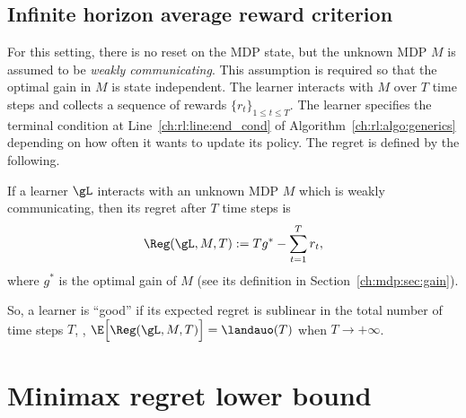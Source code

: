 \subsection{Infinite horizon average reward criterion}
For this setting, there is no reset on the MDP state, but the unknown MDP $M$ is assumed to be \emph{weakly communicating}.
This assumption is required so that the optimal gain in $M$ is state independent.
The learner interacts with $M$ over $T$ time steps and collects a sequence of rewards $\{r_t\}_{1\le t\le T}$.
The learner specifies the terminal condition at Line~\ref{ch:rl:line:end_cond} of Algorithm~\ref{ch:rl:algo:generics} depending on how often it wants to update its policy.
The regret is defined by the following.
\begin{defn}
    \label{ch:rl:defn:rg_infinite}
    If a learner $\gL$ interacts with an unknown MDP $M$ which is weakly communicating, then its regret after $T$ time steps is
    \begin{equation}
        \label{eq:rg_infinite}
        \Reg(\gL, M, T):= Tg^* -\sum_{t=1}^Tr_t,
    \end{equation}
    where $g^*$ is the optimal gain of $M$ (see its definition in Section~\ref{ch:mdp:sec:gain}).
\end{defn}
So, a learner is ``good'' if its expected regret is sublinear in the total number of time steps $T$, \ie, $\E\Big[\Reg(\gL, M, T)\Big]= \landauo(T)$ when $T\to+\infty$.




\section{Minimax regret lower bound}
\label{ch:rl:sec:baseline}

